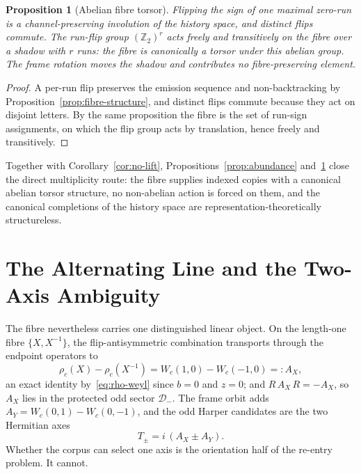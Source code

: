 \documentclass[11pt,a4paper]{article}
\newtheorem{proposition}[theorem]{Proposition}
\theoremstyle{definition}
\theoremstyle{remark}
\newcommand{\Dminus}{\mathcal{D}_{-}}
\newcommand{\AX}{A_{X}}
\newcommand{\AY}{A_{Y}}
\begin{document}
\begin{proposition}[Abelian fibre torsor]
  \label{prop:fibre-gauge}
  Flipping the sign of one maximal zero-run is a channel-preserving involution of the
  history space, and distinct flips commute.
  The run-flip group $(\mathbb{Z}_2)^r$ acts freely and transitively on the fibre over
  a shadow with $r$ runs: the fibre is canonically a torsor under this abelian group.
  The frame rotation moves the shadow and contributes no fibre-preserving element.
\end{proposition}

\begin{proof}
  A per-run flip preserves the emission sequence and non-backtracking by
  Proposition~\ref{prop:fibre-structure}, and distinct flips commute because they act on
  disjoint letters.
  By the same proposition the fibre is the set of run-sign assignments, on which the
  flip group acts by translation, hence freely and transitively.
\end{proof}

Together with Corollary~\ref{cor:no-lift}, Propositions~\ref{prop:abundance}
and~\ref{prop:fibre-gauge} close the direct multiplicity route: the fibre supplies
indexed copies with a canonical abelian torsor structure, no non-abelian action is
forced on them, and the canonical completions of the history space are
representation-theoretically structureless.

\section{The Alternating Line and the Two-Axis Ambiguity}
\label{sec:axes}

The fibre nevertheless carries one distinguished linear object.
On the length-one fibre $\{X,X^{-1}\}$, the flip-antisymmetric combination transports
through the endpoint operators to
\begin{equation}
  \rho_c(X)-\rho_c(X^{-1})=W_c(1,0)-W_c(-1,0)=:\AX,
  \label{eq:alternating-transport}
\end{equation}
an exact identity by~\eqref{eq:rho-weyl} since $b=0$ and $z=0$; and
$R\,\AX\,R=-\AX$, so $\AX$ lies in the protected odd sector $\Dminus$.
The frame orbit adds $\AY=W_c(0,1)-W_c(0,-1)$, and the odd Harper candidates are the two
Hermitian axes
\begin{equation}
  T_\pm=i\,(\AX\pm\AY).
  \label{eq:two-axes}
\end{equation}
Whether the corpus can select one axis is the orientation half of the re-entry problem.
It cannot.
\end{document}
